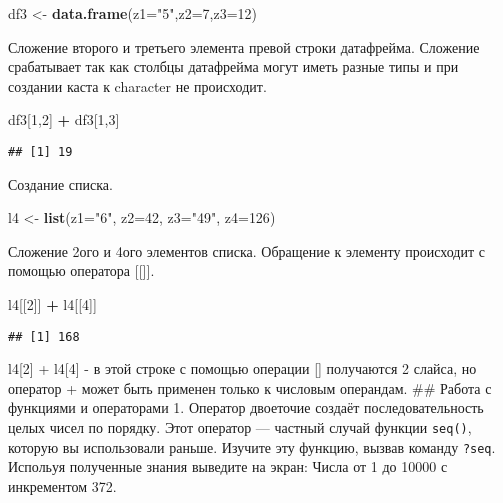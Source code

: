 \documentclass[]{article}
\newenvironment{Shaded}{\begin{snugshade}}{\end{snugshade}}
\newcommand{\KeywordTok}[1]{\textcolor[rgb]{0.13,0.29,0.53}{\textbf{#1}}}
\newcommand{\DataTypeTok}[1]{\textcolor[rgb]{0.13,0.29,0.53}{#1}}
\newcommand{\DecValTok}[1]{\textcolor[rgb]{0.00,0.00,0.81}{#1}}
\newcommand{\StringTok}[1]{\textcolor[rgb]{0.31,0.60,0.02}{#1}}
\newcommand{\OperatorTok}[1]{\textcolor[rgb]{0.81,0.36,0.00}{\textbf{#1}}}
\newcommand{\NormalTok}[1]{#1}
\begin{document}
\begin{Shaded}
\begin{Highlighting}[]
\NormalTok{df3 <-}\StringTok{ }\KeywordTok{data.frame}\NormalTok{(}\DataTypeTok{z1=}\StringTok{"5"}\NormalTok{,}\DataTypeTok{z2=}\DecValTok{7}\NormalTok{,}\DataTypeTok{z3=}\DecValTok{12}\NormalTok{)}
\end{Highlighting}
\end{Shaded}

Сложение второго и третьего элемента превой строки датафрейма. Сложение
срабатывает так как столбцы датафрейма могут иметь разные типы и при
создании каста к character не происходит.

\begin{Shaded}
\begin{Highlighting}[]
\NormalTok{df3[}\DecValTok{1}\NormalTok{,}\DecValTok{2}\NormalTok{] }\OperatorTok{+}\StringTok{ }\NormalTok{df3[}\DecValTok{1}\NormalTok{,}\DecValTok{3}\NormalTok{]}
\end{Highlighting}
\end{Shaded}

\begin{verbatim}
## [1] 19
\end{verbatim}

Создание списка.

\begin{Shaded}
\begin{Highlighting}[]
\NormalTok{l4 <-}\StringTok{ }\KeywordTok{list}\NormalTok{(}\DataTypeTok{z1=}\StringTok{"6"}\NormalTok{, }\DataTypeTok{z2=}\DecValTok{42}\NormalTok{, }\DataTypeTok{z3=}\StringTok{"49"}\NormalTok{, }\DataTypeTok{z4=}\DecValTok{126}\NormalTok{)}
\end{Highlighting}
\end{Shaded}

Сложение 2ого и 4ого элементов списка. Обращение к элементу происходит с
помощью оператора {[}{[}{]}{]}.

\begin{Shaded}
\begin{Highlighting}[]
\NormalTok{l4[[}\DecValTok{2}\NormalTok{]] }\OperatorTok{+}\StringTok{ }\NormalTok{l4[[}\DecValTok{4}\NormalTok{]]}
\end{Highlighting}
\end{Shaded}

\begin{verbatim}
## [1] 168
\end{verbatim}

l4{[}2{]} + l4{[}4{]} - в этой строке с помощью операции {[}{]}
получаются 2 слайса, но оператор + может быть применен только к числовым
операндам. \#\# Работа с функциями и операторами 1. Оператор двоеточие
создаёт последовательность целых чисел по порядку. Этот оператор ---
частный случай функции \texttt{seq()}, которую вы использовали раньше.
Изучите эту функцию, вызвав команду \texttt{?seq}. Испольуя полученные
знания выведите на экран: Числа от 1 до 10000 с инкрементом 372.
\end{document}
